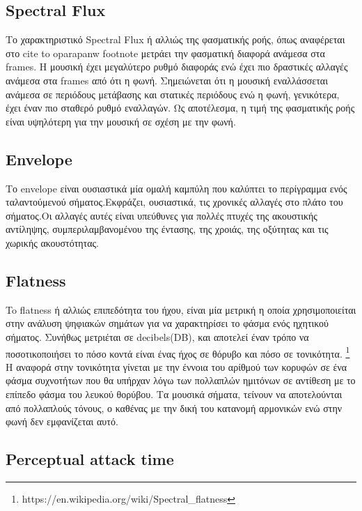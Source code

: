  \subsection{Spectral Flux}

 Το χαρακτηριστικό Spectral Flux ή αλλιώς της φασματικής ροής, όπως αναφέρεται στο 
 cite to oparapanw footnote
 μετράει την φασματική διαφορά ανάμεσα στα frames. Η μουσική έχει μεγαλύτερο ρυθμό διαφοράς ενώ έχει πιο δραστικές αλλαγές ανάμεσα στα frames από ότι η φωνή. Σημειώνεται ότι η μουσική εναλλάσσεται ανάμεσα σε περιόδους μετάβασης και στατικές περιόδους ενώ η φωνή, γενικότερα, έχει έναν πιο σταθερό ρυθμό εναλλαγών. Ως αποτέλεσμα, η τιμή της φασματικής ροής είναι υψηλότερη για την μουσική σε σχέση με την φωνή.

  \subsection{Envelope}

Το envelope είναι ουσιαστικά μία ομαλή καμπύλη που καλύπτει το περίγραμμα ενός ταλαντούμενού σήματος.Εκφράζει, ουσιαστικά, τις χρονικές αλλαγές στο πλάτο του σήματος.Οι αλλαγές αυτές είναι υπεύθυνες για πολλές πτυχές της ακουστικής αντίληψης, συμπεριλαμβανομένου της έντασης, της χροιάς, της οξύτητας και τις χωρικής ακουστότητας.


\subsection{Flatness}

To flatness ή αλλιώς επιπεδότητα του ήχου, είναι μία μετρική η οποία χρησιμοποιείται στην ανάλυση ψηφιακών σημάτων για να χαρακτηρίσει το φάσμα ενός ηχητικού σήματος. Συνήθως μετριέται σε decibels(DB), και αποτελεί έναν τρόπο να ποσοτικοποιήσει το πόσο κοντά είναι ένας ήχος σε θόρυβο και πόσο σε τονικότητα.  \footnote{https://en.wikipedia.org/wiki/Spectral\_flatness} Η αναφορά στην τονικότητα γίνεται με την έννοια του αρίθμού των κορυφών σε ένα φάσμα συχνοτήτων που θα υπήρχαν λόγω των πολλαπλών ημιτόνων σε αντίθεση με το επίπεδο φάσμα του λευκού θορύβου. Τα μουσικά σήματα, τείνουν να αποτελούνται από πολλαπλούς τόνους, ο καθένας με την δική του κατανομή αρμονικών ενώ στην φωνή δεν εμφανίζεται αυτό.


\subsection{Perceptual attack time}

